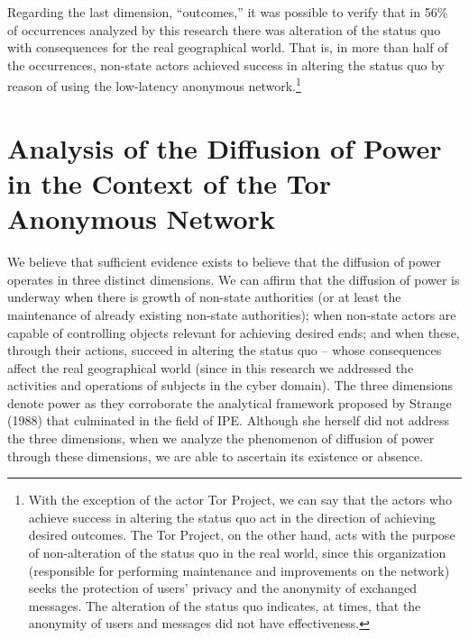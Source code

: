 Regarding the last dimension, ``outcomes,'' it was possible to verify that in 56\% of occurrences analyzed by this research there was alteration of the status quo with consequences for the real geographical world. That is, in more than half of the occurrences, non-state actors achieved success in altering the status quo by reason of using the low-latency anonymous network.\footnote{With the exception of the actor Tor Project, we can say that the actors who achieve success in altering the status quo act in the direction of achieving desired outcomes. The Tor Project, on the other hand, acts with the purpose of non-alteration of the status quo in the real world, since this organization (responsible for performing maintenance and improvements on the network) seeks the protection of users' privacy and the anonymity of exchanged messages. The alteration of the status quo indicates, at times, that the anonymity of users and messages did not have effectiveness.}

\section{Analysis of the Diffusion of Power in the Context of the Tor Anonymous Network}

We believe that sufficient evidence exists to believe that the diffusion of power operates in three distinct dimensions. We can affirm that the diffusion of power is underway when there is growth of non-state authorities (or at least the maintenance of already existing non-state authorities); when non-state actors are capable of controlling objects relevant for achieving desired ends; and when these, through their actions, succeed in altering the status quo -- whose consequences affect the real geographical world (since in this research we addressed the activities and operations of subjects in the cyber domain). The three dimensions denote power as they corroborate the analytical framework proposed by Strange (1988) that culminated in the field of IPE. Although she herself did not address the three dimensions, when we analyze the phenomenon of diffusion of power through these dimensions, we are able to ascertain its existence or absence.

